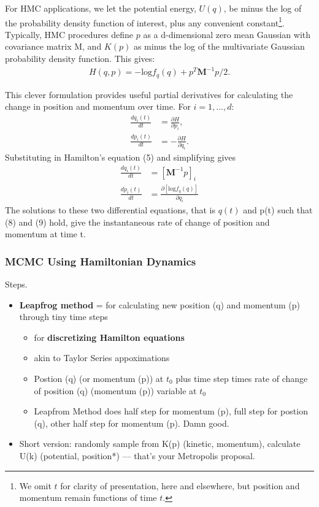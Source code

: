 For HMC applications, we let the potential energy, $U(q)$, be minus the log of the probability density function of interest, plus any convenient constant\footnote{We omit $t$ for clarity of presentation, here and elsewhere, but position and momentum remain functions of time $t$.}. Typically, HMC procedures define $p$ as a d-dimensional zero mean Gaussian with covariance matrix M, and $K(p)$ as minus the log of the multivariate Gaussian probability density function. This gives:
\begin{align}
H(q,p) = -\text{log}f_{q}(q) + p^{T}\pmb{M}^{-1}p/2.
\end{align}

This clever formulation provides useful partial derivatives for calculating the change in position and momentum over time. For $i = 1,\dots, d$:
\begin{align}
\frac{d q_{i}(t)}{dt} &= \frac{\partial H}{\partial p_{i}}, \\
\frac{d p_{i}(t)}{dt} &= -\frac{\partial H}{\partial q_{i}}.
\end{align}
Substituting in Hamilton's equation (5) and simplifying gives
\begin{align}
\frac{d q_{i}(t)}{dt} &=  [\pmb{M}^{-1}p]_{i} \\
\frac{d p_{i}(t)}{dt} &= \frac {\partial \left[ \text{log}f_{q}(q) \right]}{\partial q_{i}}
\end{align}
The solutions to these two differential equations, that is $q(t)$ and p(t) such that (8) and (9) hold, give the instantaneous rate of change of position and momentum at time t. 

\subsubsection{MCMC Using Hamiltonian Dynamics } %
Steps.
\citep{Neal2011}
\begin{itemize}

\item {\bf Leapfrog method} = for calculating new position (q) and momentum (p) through tiny time steps
  \begin{itemize}
  \item for {\bf discretizing Hamilton equations}
  \item akin to Taylor Series appoximations
  \item Postion (q) (or momentum (p)) at $t_{0}$ plus time step times rate of change of position (q) (momentum (p)) variable at $t_{0}$
  \item Leapfrom Method does half step for momentum (p), full step for postion (q), other half step for momentum (p). Damn good.

  \end{itemize}

\item Short version: randomly sample from K(p) (kinetic, momentum), calculate U(k) (potential, position*) --- that's your Metropolis proposal.
\end{itemize}


